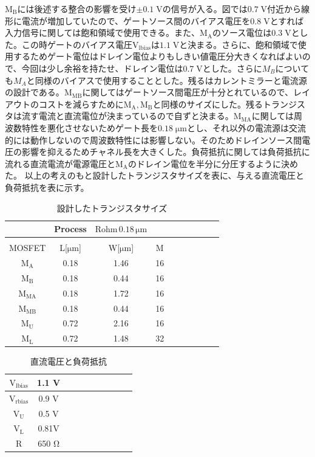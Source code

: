 \documentclass[twocolumn]{jsarticle}
\begin{document}
    $\mathrm{M_{B}}$には後述する整合の影響を受け$\pm0.1\;\mathrm{V}$の信号が入る。図では$0.7\;\mathrm{V}$付近から線形に電流が増加していたので、ゲートソース間のバイアス電圧を$0.8\;\mathrm{V}$とすれば入力信号に関しては飽和領域で使用できる。また、$\mathrm{M_{A}}$のソース電位は$0.3\;\mathrm{V}$とした。この時ゲートのバイアス電圧$\mathrm{V_{lbias}}$は$1.1\;\mathrm{V}$と決まる。さらに、飽和領域で使用するためゲート電位はドレイン電位よりもしきい値電圧分大きくなればよいので、今回は少し余裕を持たせ、ドレイン電位は$0.7\;\mathrm{V}$とした。さらに$M_{B}$についても$M_{A}$と同様のバイアスで使用することとした。残るはカレントミラーと電流源の設計である。$\mathrm{M_{MB}}$に関してはゲートソース間電圧が十分とれているので、レイアウトのコストを減らすために$\mathrm{M_{A},M_{B}}$と同様のサイズにした。残るトランジスタは流す電流と直流電位が決まっているので自ずと決まる。$\mathrm{M_{MA}}$に関しては周波数特性を悪化させないためゲート長を$0.18\;\mathrm{\mu m}$とし、それ以外の電流源は交流的には動作しないので周波数特性には影響しない。そのためドレインソース間電圧の影響を抑えるためチャネル長を大きくした。負荷抵抗に関しては負荷抵抗に流れる直流電流が電源電圧と$\mathrm{M_{A}}$のドレイン電位を半分に分圧するように決めた。
    \newpage
    以上の考えのもと設計したトランジスタサイズを表に、与える直流電圧と負荷抵抗を表に示す。
    \begin{table}[H]
    \caption{設計したトランジスタサイズ}
    \label{table:size}
    \centering
    \begin{tabular}{cccccccccc}
        \hline
        &Process&$\mathrm{Rohm\,0.18\,\mu m}$&\\
        \hline
        &&&\\
        MOSFET & L[$\mathrm{\mu m}$] & W[$\mathrm{\mu m}$] & M\\
        \hline \hline
        $\mathrm{M_{A}}$ & 0.18 & 1.46 & 16 \\
        $\mathrm{M_{B}}$ & 0.18 & 0.44 & 16 \\
        $\mathrm{M_{MA}}$& 0.18 & 1.72 & 16 \\
        $\mathrm{M_{MB}}$& 0.18 & 0.44 & 16 \\
        $\mathrm{M_{U}}$ & 0.72 & 2.16 & 16 \\
        $\mathrm{M_{L}}$ & 0.72 & 1.48 & 32 \\            
    \end{tabular}
    \end{table}
    \begin{table}[H]
    \caption{直流電圧と負荷抵抗}
    \label{table:bias}
    \centering
    \begin{tabular}{cccccccccc}
        $\mathrm{V_{lbias}}$ & 1.1 V\\\hline
        $\mathrm{V_{rbias}}$ & 0.9 V \\\hline
        $\mathrm{V_{U}}$     & 0.5 V  \\\hline
        $\mathrm{V_{L}}$     & 0.81V  \\\hline
        $\mathrm{R}$         & 650 $\mathrm{\Omega}$  
            \end{tabular}
    \end{table}
\end{document}
